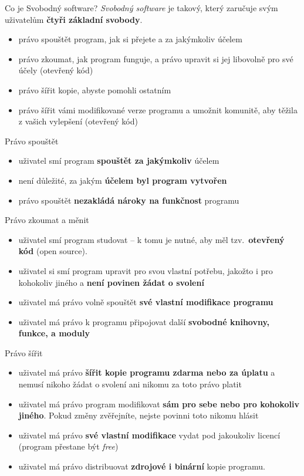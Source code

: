 \documentclass[11pt]{beamer}
\begin{document}
	\begin{frame}{Co je Svobodný software?}
		\textit{Svobodný software} je takový, který zaručuje svým uživatelům \textbf{čtyři základní svobody}.
				\begin{itemize}
			\item právo spouštět program, jak si přejete a za jakýmkoliv účelem
			\item právo zkoumat, jak program funguje, a právo upravit si jej libovolně pro své účely (otevřený kód)
			\item právo šířit kopie, abyste pomohli ostatním
			\item právo šířit vámi modifikované verze programu a umožnit komunitě, aby těžila z vašich vylepšení (otevřený kód)
		\end{itemize}
	\end{frame}

	\begin{frame}{Právo spouštět}
		\begin{itemize}
			\item uživatel smí program \textbf{spouštět za jakýmkoliv} účelem
			\item není důležité, za jakým \textbf{účelem byl program vytvořen}
			\item právo spouštět \textbf{nezakládá nároky na funkčnost} programu
		\end{itemize}
    \end{frame}	

	\begin{frame}{Právo zkoumat a měnit}
	\begin{itemize}
		\item uživatel smí program studovat -- k tomu je nutné, aby měl tzv.~\textbf{otevřený kód} (open source).
		\item uživatel si smí program upravit pro svou vlastní potřebu, jakožto i pro kohokoliv jiného a \textbf{není povinen žádat o svolení}
		\item uživatel má právo volně spouštět \textbf{své vlastní modifikace programu}
		\item uživatel má právo k programu připojovat další \textbf{svobodné knihovny, funkce, a moduly}
	\end{itemize}
	\end{frame}	

	\begin{frame}{Právo šířit}
	\begin{itemize}
		\item uživatel má právo \textbf{šířit kopie programu zdarma nebo za úplatu} a nemusí nikoho žádat o svolení ani nikomu za toto právo platit
		\item uživatel má právo program modifikovat \textbf{sám pro sebe nebo pro kohokoliv jiného}. Pokud změny zvěřejníte, nejste povinni toto nikomu hlásit
		\item uživatel má právo \textbf{své vlastní modifikace} vydat pod jakoukoliv licencí (program přestane být \textit{free})
		\item uživatel má právo distribuovat \textbf{zdrojové i binární} kopie programu.
	\end{itemize}
	\end{frame}	
\end{document}
